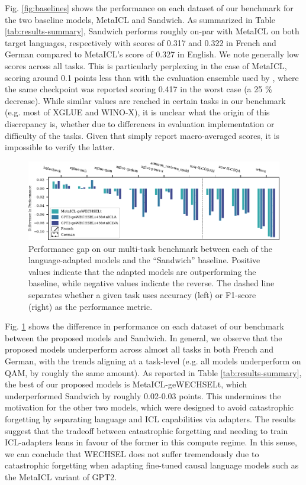 \documentclass[11pt]{article}
\begin{document}
Fig. \ref{fig:baselines} shows the performance on each dataset of our benchmark for the two baseline
models, MetaICL and Sandwich. As summarized in Table \ref{tab:results-summary}, Sandwich performs
roughly on-par with MetaICL on both target languages, respectively with scores of 0.317 and 0.322 in
French and German compared to MetaICL's score of 0.327 in English. We note generally low scores
across all tasks. This is particularly perplexing in the case of MetaICL, scoring around 0.1 points
less than with the evaluation ensemble used by \citet{min_metaicl_2022}, where the same checkpoint
was reported scoring 0.417 in the worst case (a 25 \% decrease). While similar values are reached in certain tasks in
our benchmark (e.g. most of XGLUE and WINO-X), it is unclear what the origin of this discrepancy is,
whether due to differences in evaluation implementation or difficulty of the tasks. Given that
\citet{min_metaicl_2022} simply report macro-averaged scores, it is impossible to verify the latter.

\begin{figure}[ht]
	\includegraphics{results.pdf}
	\caption{Performance gap on our multi-task benchmark between each of the language-adapted models
		and the ``Sandwich'' baseline. Positive values indicate that the adapted models are
		outperforming the baseline, while negative values indicate the reverse. The dashed line
		separates whether a given task uses accuracy (left) or F1-score (right) as the performance
		metric.}
	\label{fig:results}
\end{figure}

Fig. \ref{fig:results} shows the difference in performance on each dataset of our benchmark between
the proposed models and Sandwich. In general, we observe that the proposed models underperform
across almost all tasks in both French and German, with the trends aligning at a task-level (e.g.
all models underperform on QAM, by roughly the same amount). As reported in Table
\ref{tab:results-summary}, the best of our proposed models is MetaICL-geWECHSELt, which
underperformed Sandwich by roughly 0.02-0.03 points. This undermines the motivation for the other
two models, which were designed to avoid catastrophic forgetting by separating language and ICL
capabilities via adapters. The results suggest that the tradeoff between catastrophic forgetting and
needing to train ICL-adapters leans in favour of the former in this compute regime. In this sense,
we can conclude that WECHSEL does not suffer tremendously due to catastrophic forgetting when
adapting fine-tuned causal language models such as the MetaICL variant of GPT2.
\end{document}
